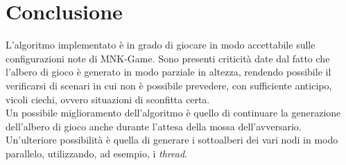 \documentclass[11pt]{article}
\begin{document}
\section*{Conclusione}
L'algoritmo implementato è in grado di giocare in modo accettabile sulle configurazioni note di MNK-Game. Sono presenti criticità date dal fatto che l'albero di gioco è generato in modo parziale in altezza, rendendo possibile il verificarsi di scenari in cui non è possibile prevedere, con sufficiente anticipo, vicoli ciechi, ovvero situazioni di sconfitta certa.\\
Un possibile miglioramento dell'algoritmo è quello di continuare la generazione dell'albero di gioco anche durante l'attesa della mossa dell'avversario.\\
Un'ulteriore possibilità è quella di generare i sottoalberi dei vari nodi in modo parallelo, utilizzando, ad esempio, i \textit{thread}.
\end{document}

